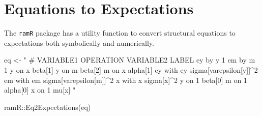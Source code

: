 \documentclass[
]{book}
\newenvironment{Shaded}{\begin{snugshade}}{\end{snugshade}}
\newcommand{\FunctionTok}[1]{\textcolor[rgb]{0.00,0.00,0.00}{#1}}
\newcommand{\NormalTok}[1]{#1}
\newcommand{\OtherTok}[1]{\textcolor[rgb]{0.56,0.35,0.01}{#1}}
\newcommand{\SpecialCharTok}[1]{\textcolor[rgb]{0.00,0.00,0.00}{#1}}
\newcommand{\StringTok}[1]{\textcolor[rgb]{0.31,0.60,0.02}{#1}}
\theoremstyle{definition}
\theoremstyle{definition}
\theoremstyle{definition}
\theoremstyle{remark}
\begin{document}
\hypertarget{equations-to-expectations-2}{%
\section{Equations to Expectations}\label{equations-to-expectations-2}}

The \texttt{ramR} package has a utility function
to convert structural equations to expectations
both symbolically and numerically.

\begin{Shaded}
\begin{Highlighting}[]
\NormalTok{eq }\OtherTok{\textless{}{-}} \StringTok{"}
\StringTok{  \# VARIABLE1 OPERATION VARIABLE2 LABEL}
\StringTok{  ey          by        y         1}
\StringTok{  em          by        m         1}
\StringTok{  y           on        x         beta[1]}
\StringTok{  y           on        m         beta[2]}
\StringTok{  m           on        x         alpha[1]}
\StringTok{  ey          with      ey        sigma[varepsilon[y]]\^{}2}
\StringTok{  em          with      em        sigma[varepsilon[m]]\^{}2}
\StringTok{  x           with      x         sigma[x]\^{}2}
\StringTok{  y           on        1         beta[0]}
\StringTok{  m           on        1         alpha[0]}
\StringTok{  x           on        1         mu[x]}
\StringTok{"}
\end{Highlighting}
\end{Shaded}

\begin{Shaded}
\begin{Highlighting}[]
\NormalTok{ramR}\SpecialCharTok{::}\FunctionTok{Eq2Expectations}\NormalTok{(eq)}
\end{Highlighting}
\end{Shaded}
\end{document}
